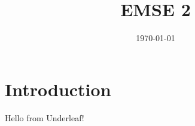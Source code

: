 \documentclass{article}
\title{EMSE 2}
\author{}
\date{\today}
\begin{document}
\maketitle

\section{Introduction}
Hello from Underleaf!
\end{document}

